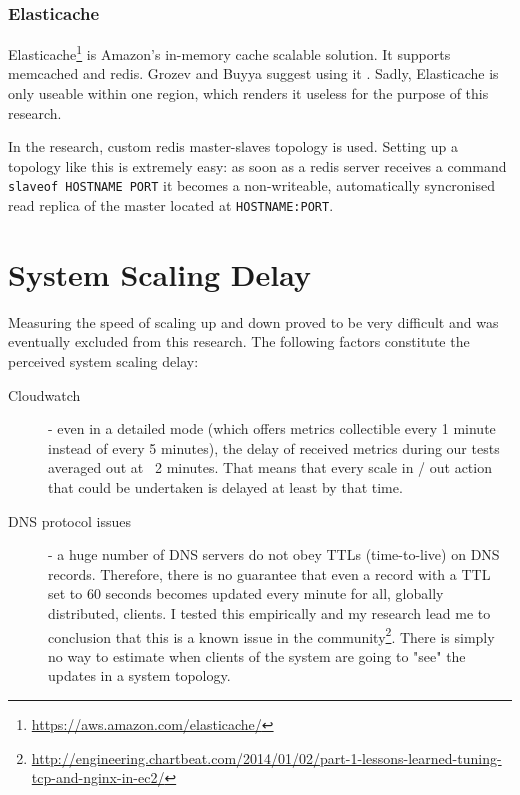 \documentclass{uvamscse}
\begin{document}
\subsubsection{Elasticache}

Elasticache\footnote{\url{https://aws.amazon.com/elasticache/}} is Amazon’s in-memory cache scalable solution. It supports memcached and redis. Grozev and Buyya suggest using it \cite{GroBuy}. Sadly, Elasticache is only useable within one region, which renders it useless for the purpose of this research.

In the research, custom redis master-slaves topology is used. Setting up a topology like this is extremely easy: as soon as a redis server receives a command \texttt{slaveof HOSTNAME PORT} it becomes a non-writeable, automatically syncronised read replica of the master located at \texttt{HOSTNAME:PORT}.

\section{System Scaling Delay}\label{System Scaling Delay}
Measuring the speed of scaling up and down proved to be very difficult and was eventually excluded from this research. The following factors constitute the perceived system scaling delay:
\begin{description}
  \item [Cloudwatch] - even in a detailed mode (which offers metrics collectible every 1 minute instead of every 5 minutes), the delay of received metrics during our tests averaged out at ~2 minutes. That means that every scale in / out action that could be undertaken is delayed at least by that time.
  \item [DNS protocol issues] - a huge number of DNS servers do not obey TTLs (time-to-live) on DNS records. Therefore, there is no guarantee that even a record with a TTL set to 60 seconds becomes updated every minute for all, globally distributed, clients. I tested this empirically and my research lead me to conclusion that this is a known issue in the community\footnote{\url{http://engineering.chartbeat.com/2014/01/02/part-1-lessons-learned-tuning-tcp-and-nginx-in-ec2/}}. There is simply no way to estimate when clients of the system are going to "see" the updates in a system topology.
\end{description}


\end{document}
